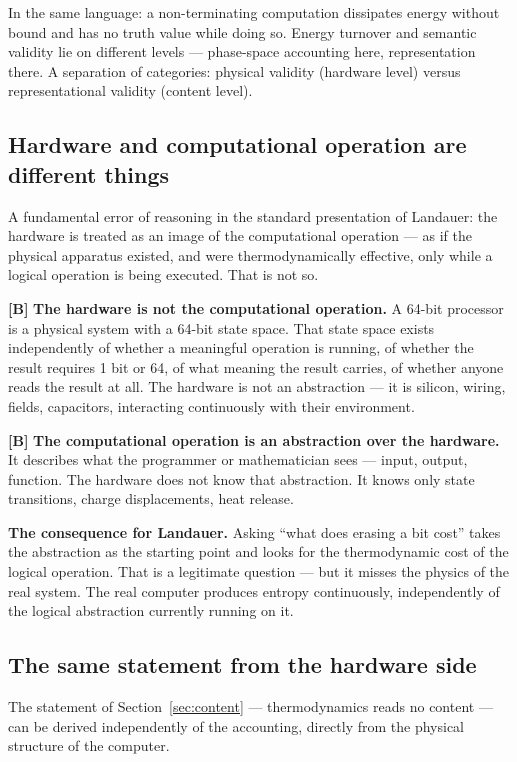 In the same language: a non-terminating computation dissipates energy without
bound and has no truth value while doing so. Energy turnover and semantic validity
lie on different levels --- phase-space accounting here, representation there. A
separation of categories: physical validity (hardware level) versus
representational validity (content level).

\subsection{Hardware and computational operation are different things}

A fundamental error of reasoning in the standard presentation of Landauer: the
hardware is treated as an image of the computational operation --- as if the
physical apparatus existed, and were thermodynamically effective, only while a
logical operation is being executed. That is not so.

\textbf{[B]} \textbf{The hardware is not the computational operation.} A 64-bit processor
is a physical system with a 64-bit state space. That state space exists
independently of whether a meaningful operation is running, of whether the result
requires 1 bit or 64, of what meaning the result carries, of whether anyone reads
the result at all. The hardware is not an abstraction --- it is silicon, wiring,
fields, capacitors, interacting continuously with their environment.

\textbf{[B]} \textbf{The computational operation is an abstraction over the hardware.} It
describes what the programmer or mathematician sees --- input, output, function.
The hardware does not know that abstraction. It knows only state transitions,
charge displacements, heat release.

\textbf{The consequence for Landauer.} Asking “what does erasing a bit cost”
takes the abstraction as the starting point and looks for the thermodynamic cost
of the logical operation. That is a legitimate question --- but it misses the
physics of the real system. The real computer produces entropy continuously,
independently of the logical abstraction currently running on it.

\subsection{The same statement from the hardware side}

The statement of Section~\ref{sec:content} --- thermodynamics reads no content ---
can be derived independently of the accounting, directly from the physical
structure of the computer.

